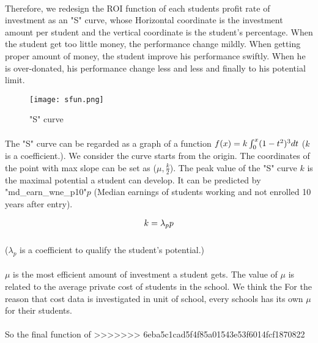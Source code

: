 \documentclass{mcmthesis}
\begin{document}
\paragraph{} Therefore, we redesign the ROI function of each students profit rate of investment as an "S" curve, whose Horizontal coordinate is the investment amount per student and the vertical coordinate is the student's percentage. When the student get too little money, the performance change mildly. When getting proper amount of money, the student improve his performance swiftly. When he is over-donated, his performance change less and less and finally to his potential limit.

\begin{figure}
\centering
\texttt{[image: sfun.png]}
\caption{"S" curve}
\label{arch}
\end{figure}

\paragraph{} The "S" curve can be regarded as a graph of a function $f(x)=k\*\int_{0}^{x}(1-t^2)^3\*dt$ ($k$ is a coefficient.). We consider the curve starts from the origin. The coordinates of the point with max slope can be set as ($\mu, \frac{k}{2}$). The peak value of the "S" curve $k$ is the maximal potential a student can develop. It can be predicted by "md\_earn\_wne\_p10"$p$ (Median earnings of students working and not enrolled 10 years after entry).

\begin{align}
k=\*\lambda_p\*p
\end{align}

\subparagraph{} ($\lambda_p$ is a coefficient to qualify the student's potential.)

\paragraph{} $\mu$ is the most efficient amount of investment a student gets. The value of $\mu$ is related to the average private cost of students in the school. We think the For the reason that cost data is investigated in unit of school, every schools has its own $\mu$ for their students. 
\paragraph{} So the final function of 
>>>>>>> 6eba5c1cad5f4f85a01543e53f6014fcf1870822
\end{document}

